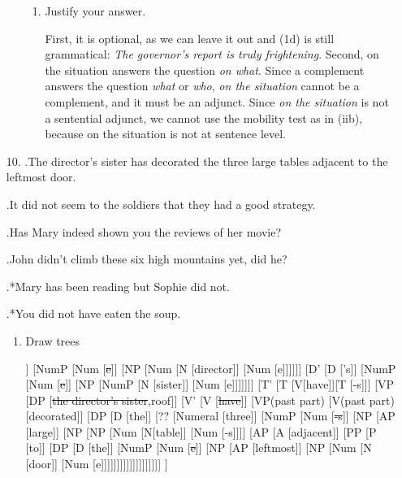 \documentclass[a4paper,12pt]{article}
\begin{document}
\begin{enumerate}
\begin{enumerate}[label=(\roman*)]
\begin{enumerate}[label=\alph*.]
              \item Justify your answer.

              First, it is optional, as we can leave it out and (1d) is still grammatical: \textit{The governor's report is truly frightening}. Second, on the situation answers the question \textit{on what}. Since a complement answers the question \textit{what} or \textit{who}, \textit{on the situation} cannot be a complement, and it must be an adjunct. Since \textit{on the situation} is not a sentential adjunct, we cannot use the mobility test as in (iib), because on the situation is not at sentence level.

          \end{enumerate}
	\end{enumerate}

	\item[10.]\setcounter{ExNo}{0}
    	\ex.The director's sister has decorated the three large tables adjacent to the leftmost door.

        \ex.It did not seem to the soldiers that they had a good strategy.

        \ex.Has Mary indeed shown you the reviews of her movie?

        \ex.John didn't climb these six high mountains yet, did he?

        \ex.*Mary has been reading but Sophie did not.

        \ex.*You did not have eaten the soup.

		\begin{enumerate}[label=(\roman*)]
        	\item Draw trees\\
        
            {\scriptsize\hspace{-7em}\begin{forest}
				[CP, for tree={parent anchor=south, child anchor=north, align=center, base=bottom, l sep=0em, s sep=0em}
    	        [C] [TP [DP [DP [D [the]] [NumP [Num [\st{e}]] [NP [Num [N [director]] [Num [e]]]]]] [D' [D ['s]] [NumP [Num [\st{e}]] [NP [NumP [N [sister]] [Num [e]]]]]]] [T' [T [V[have]][T [-s]]] [VP [DP [\st{the director's sister},roof]] [V' [V [\st{have}]] [VP(past part) [V(past part) [decorated]] [DP [D [the]] [?? [Numeral [three]] [NumP [Num [\st{-s}]] [NP [AP [large]] [NP [NP [Num [N[table]] [Num [-s]]]] [AP [A [adjacent]] [PP [P [to]] [DP [D [the]] [NumP [Num [\st{e}]] [NP [AP [leftmost]] [NP [Num [N [door]] [Num [e]]]]]]]]]]]]]]]]]]]
                ]
            \end{forest}}


\end{enumerate}
\end{enumerate}
\end{document}
